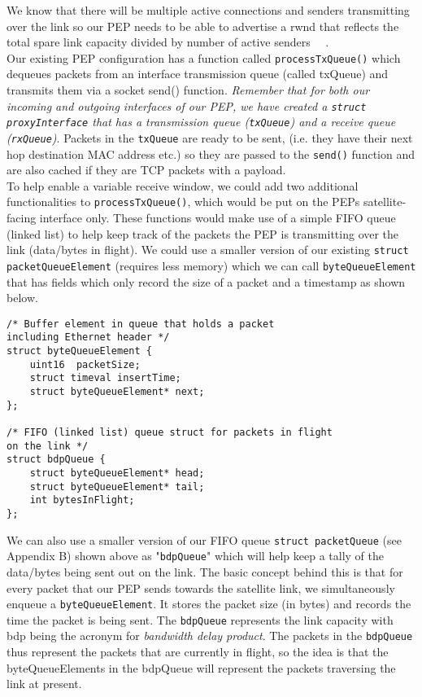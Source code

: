 We know that there will be multiple active connections and senders transmitting over the link so our PEP needs to be able to advertise a rwnd that reflects the total spare link capacity divided by number of active senders ~\cite{1}~\cite{2}. \\

Our existing PEP configuration has a function called {\tt processTxQueue()} which dequeues packets from an interface transmission queue (called txQueue) and transmits them via a socket send() function. \emph{Remember that for both our incoming and outgoing interfaces of our PEP, we have created a {\tt struct proxyInterface} that has a transmission queue ({\tt txQueue}) and a receive queue ({\tt rxQueue})}. Packets in the {\tt txQueue} are ready to be sent, (i.e. they have their next hop destination MAC address etc.) so they are passed to the {\tt send()} function and are also cached if they are TCP packets with a payload. \\ 

To help enable a variable receive window, we could add two additional functionalities to {\tt processTxQueue()}, which would be put on the PEPs satellite-facing interface only. These functions would make use of a simple FIFO queue (linked list) to help keep track of the packets the PEP is transmitting over the link (data/bytes in flight). We could use a smaller version of our existing {\tt struct packetQueueElement} (requires less memory) which we can call {\tt byteQueueElement} that has fields which only record the size of a packet and a timestamp as shown below. \\

\begin{lstlisting}
/* Buffer element in queue that holds a packet 
including Ethernet header */
struct byteQueueElement {
    uint16  packetSize;
    struct timeval insertTime;
    struct byteQueueElement* next;
};

/* FIFO (linked list) queue struct for packets in flight 
on the link */
struct bdpQueue {
    struct byteQueueElement* head;
    struct byteQueueElement* tail;
    int bytesInFlight;
};
\end{lstlisting}

We can also use a smaller version of our FIFO queue {\tt struct packetQueue} (see Appendix B) shown above as "{\tt bdpQueue}" which will help keep a tally of the data/bytes being sent out on the link. The basic concept behind this is that for every packet that our PEP sends towards the satellite link, we simultaneously enqueue a {\tt byteQueueElement}. It stores the packet size (in bytes) and records the time the packet is being sent. The {\tt bdpQueue} represents the link capacity with bdp being the acronym for \emph{bandwidth delay product}. The packets in the {\tt bdpQueue} thus represent the packets that are currently in flight, so the idea is that the byteQueueElements in the bdpQueue will represent the packets traversing the link at present.\\

